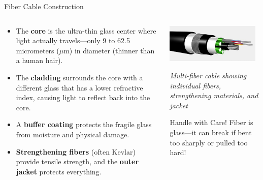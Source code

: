 \documentclass[aspectratio=169]{beamer}
\begin{document}
\begin{frame}{Fiber Cable Construction}
    \begin{columns}[T]
        \begin{column}{0.55\textwidth}
            \begin{itemize}
                \item The \textbf{core} is the ultra-thin glass center where light actually travels---only 9 to 62.5 micrometers ($\mu$m) in diameter (thinner than a human hair).
                \item The \textbf{cladding} surrounds the core with a different glass that has a lower refractive index, causing light to reflect back into the core.
                \item A \textbf{buffer coating} protects the fragile glass from moisture and physical damage.
                \item \textbf{Strengthening fibers} (often Kevlar) provide tensile strength, and the \textbf{outer jacket} protects everything.
            \end{itemize}
        \end{column}
        \begin{column}{0.4\textwidth}
            \centering
            \includegraphics[width=0.95\textwidth]{Multi_fiber_cable_cutaway.jpg}
            
            \vspace{0.3cm}
            \small{\textit{Multi-fiber cable showing individual fibers, strengthening materials, and jacket}}
            
            \vspace{0.2cm}
            \begin{alertblock}{Handle with Care!}
                Fiber is glass---it can break if bent too sharply or pulled too hard!
            \end{alertblock}
        \end{column}
    \end{columns}
\end{frame}
\end{document}
